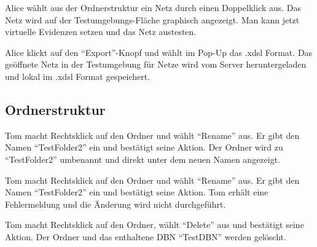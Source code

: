 \documentclass[parskip=full,11pt,twoside]{scrartcl}
\begin{document}

{Alice wählt aus der Ordnerstruktur ein Netz durch einen Doppelklick aus.}
{Das Netz wird auf der Testumgebungs-Fläche graphisch angezeigt. Man kann jetzt virtuelle Evidenzen setzen und das Netz austesten.}

{Alice klickt auf den \enquote{Export}-Knopf und wählt im Pop-Up das .xdsl Format.}
{Das geöffnete Netz in der Testumgebung für Netze wird vom Server heruntergeladen und lokal im .xdsl Format gespeichert. }

\subsection{Ordnerstruktur}



{Tom macht Rechtsklick auf den Ordner und wählt \enquote{Rename} aus. Er gibt den Namen \enquote{TestFolder2} ein und bestätigt seine Aktion.}
{Der Ordner wird zu \enquote{TestFolder2} umbenannt und direkt unter dem neuen Namen angezeigt.}

{Tom macht Rechtsklick auf den Ordner und wählt \enquote{Rename} aus. Er gibt den Namen \enquote{TestFolder2} ein und bestätigt seine Aktion.}
{Tom erhält eine Fehlermeldung und die Änderung wird nicht durchgeführt.}

{Tom macht Rechtsklick auf den Ordner, wählt \enquote{Delete} aus und bestätigt seine Aktion.}
{Der Ordner und das enthaltene DBN \enquote{TestDBN} werden gelöscht.}
\end{document}

